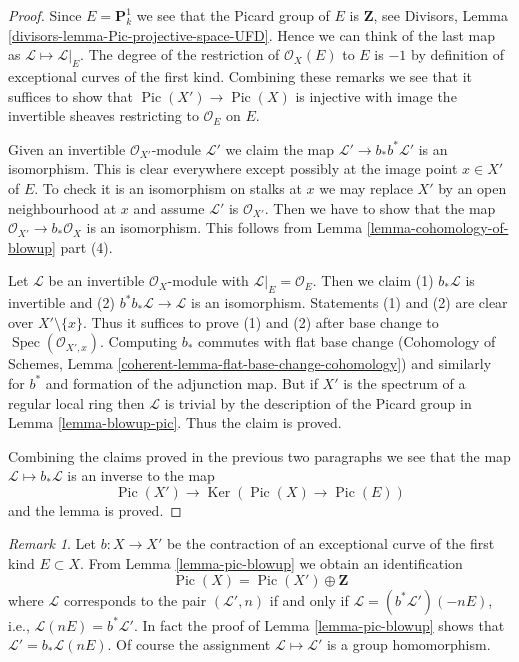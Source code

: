 \documentclass{stacks-project}
\theoremstyle{plain}
\theoremstyle{definition}
\theoremstyle{remark}
\newtheorem{remark}[subsection]{Remark}
\numberwithin{equation}{subsection}
\def\Spec{\mathop{\mathrm{Spec}}}
\def\Ker{\mathop{\mathrm{Ker}}}
\def\Pic{\mathop{\mathrm{Pic}}\nolimits}
\begin{document}
\begin{proof}
Since $E = \mathbf{P}^1_k$ we see that the Picard group of $E$
is $\mathbf{Z}$, see Divisors, Lemma
\ref{divisors-lemma-Pic-projective-space-UFD}.
Hence we can think of the last map as $\mathcal{L} \mapsto \mathcal{L}|_E$.
The degree of the restriction of $\mathcal{O}_X(E)$ to $E$ is $-1$
by definition of exceptional curves of the first kind. Combining these
remarks we see that it
suffices to show that $\Pic(X') \to \Pic(X)$ is injective
with image the invertible sheaves restricting to $\mathcal{O}_E$ on $E$.

\medskip\noindent
Given an invertible $\mathcal{O}_{X'}$-module
$\mathcal{L}'$ we claim the map $\mathcal{L}' \to b_*b^*\mathcal{L}'$
is an isomorphism. This is clear everywhere except possibly at the image
point $x \in X'$ of $E$. To check it is an isomorphism on stalks
at $x$ we may replace $X'$ by an open neighbourhood at $x$ and
assume $\mathcal{L}'$ is $\mathcal{O}_{X'}$. Then we have to
show that the map $\mathcal{O}_{X'} \to b_*\mathcal{O}_X$
is an isomorphism. This follows from Lemma \ref{lemma-cohomology-of-blowup}
part (4).

\medskip\noindent
Let $\mathcal{L}$ be an invertible $\mathcal{O}_X$-module with
$\mathcal{L}|_E = \mathcal{O}_E$. Then we claim 
(1) $b_*\mathcal{L}$ is invertible and
(2) $b^*b_*\mathcal{L} \to \mathcal{L}$ is an isomorphism.
Statements (1) and (2) are clear over $X' \setminus \{x\}$.
Thus it suffices to prove (1) and (2) after base change
to $\Spec(\mathcal{O}_{X', x})$.
Computing $b_*$ commutes with flat base change
(Cohomology of Schemes, Lemma \ref{coherent-lemma-flat-base-change-cohomology})
and similarly for $b^*$ and formation of the adjunction map.
But if $X'$ is the spectrum of a regular local ring
then $\mathcal{L}$ is trivial by the description of
the Picard group in Lemma \ref{lemma-blowup-pic}. Thus
the claim is proved.

\medskip\noindent
Combining the claims proved in the previous two paragraphs we
see that the map $\mathcal{L} \mapsto b_*\mathcal{L}$
is an inverse to the map
$$
\Pic(X') \longrightarrow \Ker(\Pic(X) \to \Pic(E))
$$
and the lemma is proved.
\end{proof}

\begin{remark}
\label{remark-pic-blowup}
Let $b : X \to X'$ be the contraction of an
exceptional curve of the first kind $E \subset X$.
From Lemma \ref{lemma-pic-blowup} we obtain an identification
$$
\Pic(X) = \Pic(X') \oplus \mathbf{Z}
$$
where $\mathcal{L}$ corresponds to the pair $(\mathcal{L}', n)$ if and only if
$\mathcal{L} = (b^*\mathcal{L}')(-nE)$, i.e.,
$\mathcal{L}(nE) = b^*\mathcal{L}'$. In fact the proof of
Lemma \ref{lemma-pic-blowup} shows that $\mathcal{L}' = b_*\mathcal{L}(nE)$.
Of course the assignment $\mathcal{L} \mapsto \mathcal{L}'$ is
a group homomorphism.
\end{remark}
\end{document}
